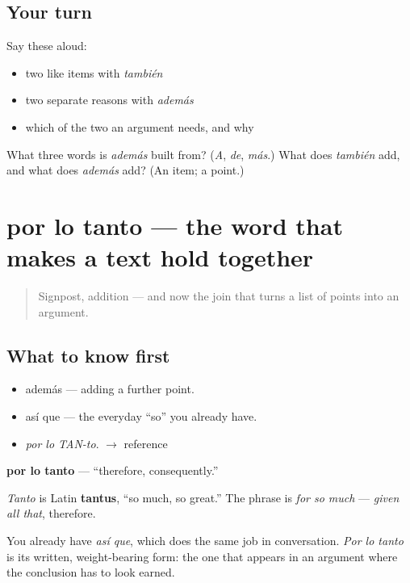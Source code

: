 \subsection*{Your turn}
Say these aloud:

\begin{itemize}
\raggedright
  \item two like items with \emph{también}
  \item two separate reasons with \emph{además}
  \item which of the two an argument needs, and why
\end{itemize}

\begin{tcolorbox}[breakable,colback=teal!4,colframe=teal!35!black,title={Before you move on}]
What three words is \emph{además} built from? (\emph{A}, \emph{de}, \emph{más}.) What does \emph{también} add, and what does \emph{además} add? (An item; a point.)
\end{tcolorbox}
\section[por lo tanto]{por lo tanto — the word that makes a text hold together}

\label{lesson:ES-C273-por-lo-tanto}



\begin{quote}
Signpost, addition — and now the join that turns a list of points into an argument.
\end{quote}

\subsection*{What to know first}
\begin{itemize}
\raggedright
  \item además — adding a further point.
  \item así que — the everyday \textquotedblleft{}so\textquotedblright{} you already have.
\end{itemize}

\begin{sounds}
\begin{itemize}
\raggedright
  \item \emph{por lo TAN-to}. $\to$ reference
\end{itemize}
\end{sounds}

\begin{cousinweb}
\textbf{por lo tanto} — \textquotedblleft{}therefore, consequently.\textquotedblright{}

\emph{Tanto} is Latin \textbf{tantus}, \textquotedblleft{}so much, so great.\textquotedblright{} The phrase is \emph{for so much} — \emph{given all that}, therefore.

You already have \emph{así que}, which does the same job in conversation. \emph{Por lo tanto} is its written, weight-bearing form: the one that appears in an argument where the conclusion has to look earned.
\end{cousinweb}

